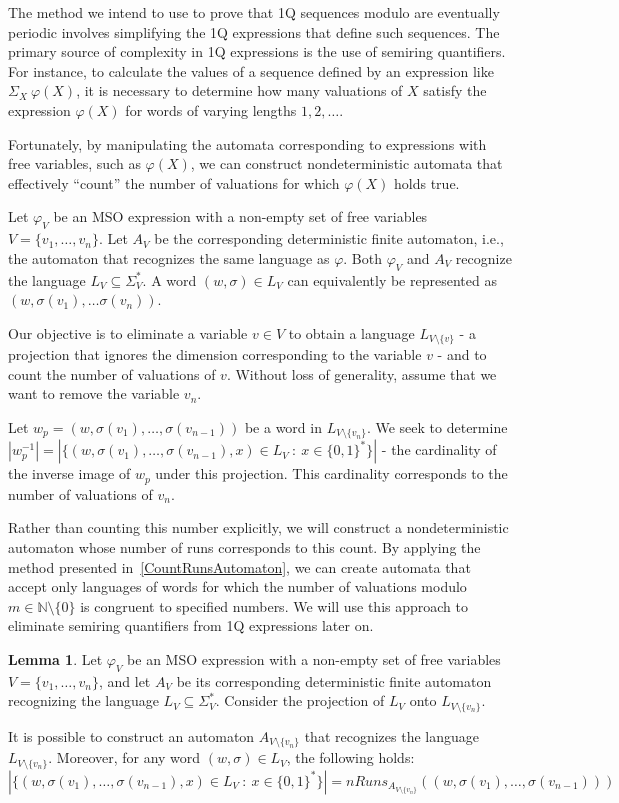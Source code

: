 \documentclass[12pt]{article}
\theoremstyle{definition}
\newtheorem{lemma}[theorem]{Lemma}
\begin{document}
The method we intend to use to prove that 1Q sequences modulo are eventually periodic involves simplifying the 1Q expressions that define such sequences. The primary source of complexity in 1Q expressions is the use of semiring quantifiers. For instance, to calculate the values of a sequence defined by an expression like $\Sigma_X \ \varphi(X)$, it is necessary to determine how many valuations of $X$ satisfy the expression $\varphi(X)$ for words of varying lengths $1,2,\ldots$.

Fortunately, by manipulating the automata corresponding to expressions with free variables, such as $\varphi(X)$, we can construct nondeterministic automata that effectively ``count'' the number of valuations for which $\varphi(X)$ holds true.

Let $\varphi_V$ be an MSO expression with a non-empty set of free variables $V = \{v_1, \ldots, v_n\}$. Let $A_V$ be the corresponding deterministic finite automaton, i.e., the automaton that recognizes the same language as $\varphi$. Both $\varphi_V$ and $A_V$ recognize the language $L_V \subseteq \Sigma_V^*$. A word $(w, \sigma) \in L_V$ can equivalently be represented as $(w, \sigma(v_1), \ldots \sigma(v_n))$.

Our objective is to eliminate a variable $v \in V$ to obtain a language $L_{V \setminus \{v\}}$ - a projection that ignores the dimension corresponding to the variable $v$ - and to count the number of valuations of $v$. Without loss of generality, assume that we want to remove the variable $v_n$.

Let $w_p = (w, \sigma(v_1), \ldots, \sigma(v_{n-1}))$ be a word in $L_{V \setminus \{v_n\}}$. We seek to determine $|w_p^{-1}| = |\{ (w, \sigma(v_1), \ldots, \sigma(v_{n-1}), x) \in L_V \ : \ x \in \{0,1\}^* \}|$ - the cardinality of the inverse image of $w_p$ under this projection. This cardinality corresponds to the number of valuations of $v_n$.

Rather than counting this number explicitly, we will construct a nondeterministic automaton whose number of runs corresponds to this count. By applying the method presented in~\cref{CountRunsAutomaton}, we can create automata that accept only languages of words for which the number of valuations modulo $m \in \mathbb{N} \setminus \{0\}$ is congruent to specified numbers. We will use this approach to eliminate semiring quantifiers from 1Q expressions later on.

\begin{lemma}
\label{LemElimVar}
    Let $\varphi_V$ be an MSO expression with a non-empty set of free variables $V = \{v_1, \ldots, v_n\}$, and let $A_V$ be its corresponding deterministic finite automaton recognizing the language $L_V \subseteq \Sigma_V^*$. Consider the projection of $L_V$ onto $L_{V \setminus \{v_n\}}$. 
    
    It is possible to construct an automaton $A_{V \setminus \{v_n\}}$ that recognizes the language $L_{V \setminus \{v_n\}}$. Moreover, for any word $(w, \sigma) \in L_V$, the following holds:
    $$|\{ (w, \sigma(v_1), \ldots, \sigma(v_{n-1}), x) \in L_V \ : \ x \in \{0,1\}^* \}| = nRuns_{A_{V \setminus \{v_n\}}}((w, \sigma(v_1), \ldots, \sigma(v_{n-1})))$$
\end{lemma}
\end{document}
